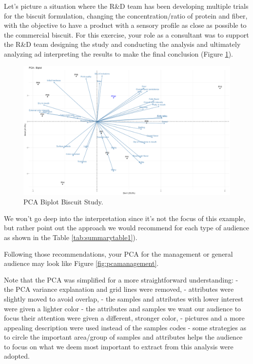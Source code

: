 \documentclass[
]{krantz}
\begin{document}
Let's picture a situation where the R\&D team has been developing multiple trials for the biscuit formulation, changing the concentration/ratio of protein and fiber, with the objective to have a product with a sensory profile as close as possible to the commercial biscuit. For this exercise, your role as a consultant was to support the R\&D team designing the study and conducting the analysis and ultimately analyzing ad interpreting the results to make the final conclusion (Figure \ref{fig:pca}).

\begin{figure}

{\centering \includegraphics[width=0.9\linewidth]{images/PCA} 

}

\caption{PCA Biplot Biscuit Study.}\label{fig:pca}
\end{figure}

We won't go deep into the interpretation since it's not the focus of this example, but rather point out the approach we would recommend for each type of audience as shown in the Table \ref{tab:summarytable1}).

Following those recommendations, your PCA for the management or general audience may look like Figure \ref{fig:pcamanagement}.

Note that the PCA was simplified for a more straightforward understanding:
- the PCA variance explanation and grid lines were removed,
- attributes were slightly moved to avoid overlap,
- the samples and attributes with lower interest were given a lighter color
- the attributes and samples we want our audience to focus their attention were given a different, stronger color,
- pictures and a more appealing description were used instead of the samples codes
- some strategies as to circle the important area/group of samples and attributes helps the audience to focus on what we deem most important to extract from this analysis were adopted.
\end{document}
